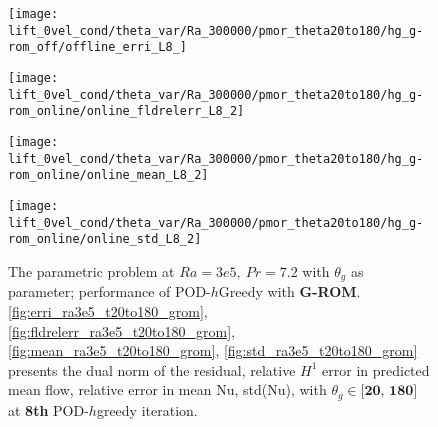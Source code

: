 \begin{figure}[h!]
    \begin{minipage}[b]{.25\linewidth}
        \centering \texttt{[image: lift\_0vel\_cond/theta\_var/Ra\_300000/pmor\_theta20to180/hg\_g-rom\_off/offline\_erri\_L8\_]}
        \label{fig:erri_ra3e5_t20to180_grom}
    \end{minipage}%
    \begin{minipage}[b]{.25\linewidth}
        \centering \texttt{[image: lift\_0vel\_cond/theta\_var/Ra\_300000/pmor\_theta20to180/hg\_g-rom\_online/online\_fldrelerr\_L8\_2]}
        \label{fig:fldrelerr_ra3e5_t20to180_grom}
    \end{minipage}
    \begin{minipage}[b]{.25\linewidth}
        \centering \texttt{[image: lift\_0vel\_cond/theta\_var/Ra\_300000/pmor\_theta20to180/hg\_g-rom\_online/online\_mean\_L8\_2]}
        \label{fig:mean_ra3e5_t20to180_grom}
    \end{minipage}%
    \begin{minipage}[b]{.25\linewidth}
        \centering \texttt{[image: lift\_0vel\_cond/theta\_var/Ra\_300000/pmor\_theta20to180/hg\_g-rom\_online/online\_std\_L8\_2]}
        \label{fig:std_ra3e5_t20to180_grom}
    \end{minipage} 
    \caption{The parametric problem at $Ra=3e5,~Pr=7.2$ with $\theta_g$ as
    parameter; performance of POD-$h$Greedy with \textbf{G-ROM}.  \ref{fig:erri_ra3e5_t20to180_grom},
    \ref{fig:fldrelerr_ra3e5_t20to180_grom}, \ref{fig:mean_ra3e5_t20to180_grom}, \ref{fig:std_ra3e5_t20to180_grom}
    presents the dual norm of the residual, relative $H^1$ error in predicted
    mean flow, relative error in mean Nu, std(Nu), with $\theta_g \in
    \textbf{[20,~180]}$ at \textbf{8th} POD-$h$greedy iteration.}
    \label{fig:online_ra3e5_t20to180_grom} 
\end{figure}

